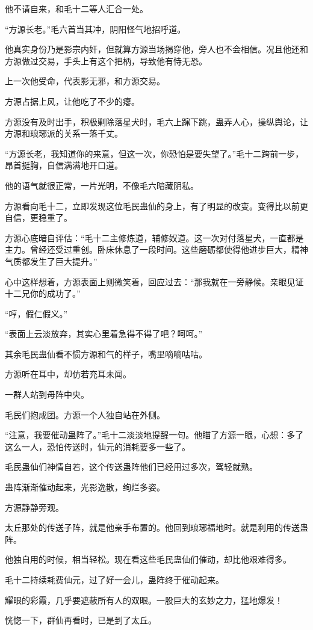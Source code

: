 \begin{this_body}
他不请自来，和毛十二等人汇合一处。

“方源长老。”毛六首当其冲，阴阳怪气地招呼道。

他真实身份乃是影宗内奸，但就算方源当场揭穿他，旁人也不会相信。况且他还和方源做过交易，手头上有这个把柄，导致他有恃无恐。

上一次他受命，代表影无邪，和方源交易。

方源占据上风，让他吃了不少的瘪。

方源没有及时出手，积极剿除落星犬时，毛六上蹿下跳，蛊弄人心，操纵舆论，让方源和琅琊派的关系一落千丈。

“方源长老，我知道你的来意，但这一次，你恐怕是要失望了。”毛十二跨前一步，昂首挺胸，自信满满地开口道。

他的语气就很正常，一片光明，不像毛六暗藏阴私。

方源看向毛十二，立即发现这位毛民蛊仙的身上，有了明显的改变。变得比以前更自信，更稳重了。

方源心底暗自评估：“毛十二主修炼道，辅修奴道。这一次对付落星犬，一直都是主力。曾经还受过重创。卧床休息了一段时间。这些磨砺都使得他进步巨大，精神气质都发生了巨大提升。”

心中这样想着，方源表面上则微笑着，回应过去：“那我就在一旁静候。亲眼见证十二兄你的成功了。”

“哼，假仁假义。”

“表面上云淡放弃，其实心里着急得不得了吧？呵呵。”

其余毛民蛊仙看不惯方源和气的样子，嘴里嘀嘀咕咕。

方源听在耳中，却仿若充耳未闻。

一群人站到母阵中央。

毛民们抱成团。方源一个人独自站在外侧。

“注意，我要催动蛊阵了。”毛十二淡淡地提醒一句。他瞄了方源一眼，心想：多了这么一人，恐怕传送时，仙元的消耗要多一些了。

毛民蛊仙们神情自若，这个传送蛊阵他们已经用过多次，驾轻就熟。

蛊阵渐渐催动起来，光影逸散，绚烂多姿。

方源静静旁观。

太丘那处的传送子阵，就是他亲手布置的。他回到琅琊福地时。就是利用的传送蛊阵。

他独自用的时候，相当轻松。现在看这些毛民蛊仙们催动，却比他艰难得多。

毛十二持续耗费仙元，过了好一会儿，蛊阵终于催动起来。

耀眼的彩霞，几乎要遮蔽所有人的双眼。一股巨大的玄妙之力，猛地爆发！

恍惚一下，群仙再看时，已是到了太丘。


\end{this_body}
